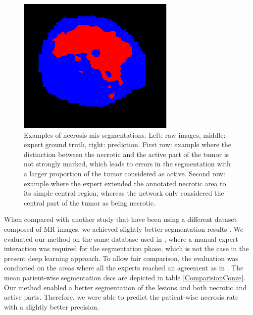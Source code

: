 \begin{figure}[!ht]
\begin{minipage}{4cm}
	\end{minipage} \hspace{-0.3cm}
	\begin{minipage}{4cm}
		\includegraphics[width=\linewidth]{images/NecrosisVE_Pred_Pat0_13_crop}
	\end{minipage} 
	\caption{Examples of necrosis mis-segmentations. Left: raw images, middle: expert ground truth, right: prediction. First row: example where the distinction between the necrotic and the active part of the tumor is not strongly marked, which leads to errors in the segmentation with a larger proportion of the tumor considered as active. Second row: example where the expert extended the annotated necrotic area to its simple central region, whereas the network only considered the central part of the tumor as being necrotic.}
	\label{fig:missegmentation_Necrosis_IJCARS}
\end{figure}

When compared with another study that have been using a different dataset composed of MR images, we achieved slightly better segmentation results \cite{Zhang}.
We evaluated our method on the same database used in \cite{Conze2017}, where a manual expert interaction was required for the segmentation phase, which is not the case in the present deep learning approach. To allow fair comparison, the evaluation was conducted on the areas where all the experts reached an agreement as in \cite{Conze2017}. The mean patient-wise segmentation \ac{dsc}s are depicted in table \ref{ComparisionConze}. Our method enabled a better segmentation of the lesions and both necrotic and active parts. Therefore, we were able to predict the patient-wise necrosis rate with a slightly better precision. 

